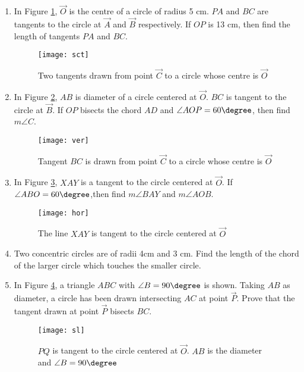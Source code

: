 \begin{enumerate}
	\item In Figure \ref{fig:sct1}, $\vec{O}$ is the centre of a circle of radius 5 cm. $PA$ and $BC$ are tangents to the circle at $\vec{A}$ and $\vec{B}$ respectively. If $OP$ is 13 cm, then find the length of tangents $PA$ and $BC$.
		\begin{figure}[H]
			\centering
			\texttt{[image: sct]}
			\caption{Two tangents drawn from point $\vec{C}$ to a circle whose centre is $\vec{O}$}
			\label{fig:sct1}
		\end{figure}

	\item In Figure \ref{fig:ver1}, $AB$ is diameter of a circle centered at $\vec{O}$. $BC$ is tangent to the circle at $\vec{B}$. If $OP$ bisects the chord $AD$ and $\angle AOP=60\degree$, then find $m\angle C$.
		\begin{figure}[H]
			\centering
			\texttt{[image: ver]}
			\caption{Tangent $BC$ is drawn from point $\vec{C}$ to a circle whose centre is $\vec{O}$}
			\label{fig:ver1}
		\end{figure}

	\item In Figure \ref{fig:hor1}, $XAY$ is a tangent to the circle centered at $\vec{O}$. If $\angle ABO=60\degree$,then find $m\angle BAY$ and $m\angle AOB$.
		\begin{figure}
			\centering
			\texttt{[image: hor]}
			\caption{The line $XAY$ is tangent to the circle centered at $\vec{O}$}
			\label{fig:hor1}
		\end{figure}

	\item Two concentric circles are of radii 4cm and 3 cm. Find the length of the chord of the larger circle which touches the smaller circle.

	\item In Figure \ref{fig:sl1}, a triangle $ABC$ with $\angle B=90\degree$ is shown. Taking $AB$ as diameter, a circle has been drawn intersecting $AC$ at point $\vec{P}$. Prove that the tangent drawn at point $\vec{P}$ bisects $BC$.
		\begin{figure}[H]
			\centering
			\texttt{[image: sl]}
			\caption{$PQ$ is tangent to the circle centered at $\vec{O}$. $AB$ is the diameter and $\angle B=90\degree$}
			\label{fig:sl1}
		\end{figure}
\end{enumerate}
